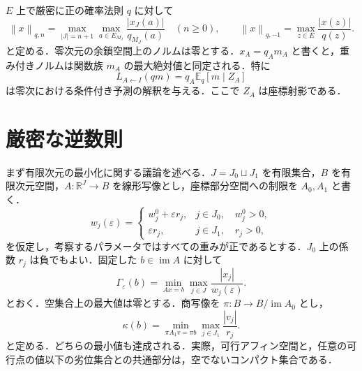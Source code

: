 \documentclass[11pt,a4paper]{article}
\numberwithin{equation}{section}
\theoremstyle{japanese}
\theoremstyle{remark}
\newcommand{\R}{\mathbb R}
\newcommand{\im}{\operatorname{im}}
\newcommand{\norm}[1]{\left\lVert #1\right\rVert}
\begin{document}
$E$ 上で厳密に正の確率法則 $q$ に対して
\begin{equation}\label{eq:weighted}
 \norm{x}_{q,n}=\max_{|J|=n+1}\max_{a\in E_{M_J}}
 \frac{|x_J(a)|}{q_{M_J}(a)}\quad(n\ge0),\qquad
 \norm{x}_{q,-1}=\max_{z\in E}\frac{|x(z)|}{q(z)}.
\end{equation}
と定める．零次元の余鎖空間上のノルムは零とする．$x_A=q_A m_A$ と書くと，重み付きノルムは関数族 $m_A$ の最大絶対値と同定される．特に
\[
 L_{A\leftarrow I}(qm)=q_A\mathbb E_q[m\mid Z_A]
\]
は零次における条件付き予測の解釈を与える．ここで $Z_A$ は座標射影である．

\section{厳密な逆数則}\label{sec:reciprocal}
まず有限次元の最小化に関する議論を述べる．$J=J_0\sqcup J_1$ を有限集合，$B$ を有限次元空間，$A:\R^J\to B$ を線形写像とし，座標部分空間への制限を $A_0,A_1$ と書く．
\begin{equation}\label{eq:weights}
 w_j(\varepsilon)=
 \begin{cases}
 w_j^0+\varepsilon r_j,&j\in J_0,\quad w_j^0>0,\\
 \varepsilon r_j,&j\in J_1,\quad r_j>0,
 \end{cases}
\end{equation}
を仮定し，考察するパラメータではすべての重みが正であるとする．$J_0$ 上の係数 $r_j$ は負でもよい．固定した $b\in\im A$ に対して
\begin{equation}\label{eq:minimum}
 \Gamma_\varepsilon(b)=\min_{Ax=b}\max_{j\in J}\frac{|x_j|}{w_j(\varepsilon)}.
\end{equation}
とおく．空集合上の最大値は零とする．商写像を $\pi:B\to B/\im A_0$ とし，
\begin{equation}\label{eq:coefficient}
 \kappa(b)=\min_{\pi A_1v=\pi b}\max_{j\in J_1}\frac{|v_j|}{r_j}.
\end{equation}
と定める．どちらの最小値も達成される．実際，可行アフィン空間と，任意の可行点の値以下の劣位集合との共通部分は，空でないコンパクト集合である．
\end{document}
